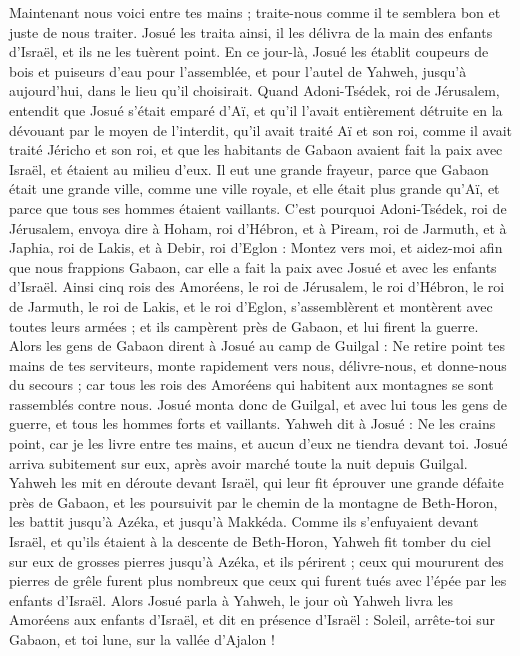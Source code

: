 \begin{multicols}{2}
Maintenant nous voici entre tes mains ; traite-nous comme il te semblera bon et juste de nous traiter.
Josué les traita ainsi, il les délivra de la main des enfants d’Israël, et ils ne les tuèrent point.
En ce jour-là, Josué les établit coupeurs de bois et puiseurs d’eau pour l’assemblée, et pour l’autel de Yahweh, jusqu’à aujourd’hui, dans le lieu qu’il choisirait.
\VerseOne{}Quand Adoni-Tsédek, roi de Jérusalem, entendit que Josué s’était emparé d’Aï, et qu’il l’avait entièrement détruite en la dévouant par le moyen de l'interdit, qu’il avait traité Aï et son roi, comme il avait traité Jéricho et son roi, et que les habitants de Gabaon avaient fait la paix avec Israël, et étaient au milieu d’eux.
Il eut une grande frayeur, parce que Gabaon était une grande ville, comme une ville royale, et elle était plus grande qu’Aï, et parce que tous ses hommes étaient vaillants.
C’est pourquoi Adoni-Tsédek, roi de Jérusalem, envoya dire à Hoham, roi d’Hébron, et à Piream, roi de Jarmuth, et à Japhia, roi de Lakis, et à Debir, roi d’Eglon :
Montez vers moi, et aidez-moi afin que nous frappions Gabaon, car elle a fait la paix avec Josué et avec les enfants d’Israël.
Ainsi cinq rois des Amoréens, le roi de Jérusalem, le roi d’Hébron, le roi de Jarmuth, le roi de Lakis, et le roi d’Eglon, s’assemblèrent et montèrent avec toutes leurs armées ; et ils campèrent près de Gabaon, et lui firent la guerre.
Alors les gens de Gabaon dirent à Josué au camp de Guilgal : Ne retire point tes mains de tes serviteurs, monte rapidement vers nous, délivre-nous, et donne-nous du secours ; car tous les rois des Amoréens qui habitent aux montagnes se sont rassemblés contre nous.
Josué monta donc de Guilgal, et avec lui tous les gens de guerre, et tous les hommes forts et vaillants.
Yahweh dit à Josué : Ne les crains point, car je les livre entre tes mains, et aucun d’eux ne tiendra devant toi.
Josué arriva subitement sur eux, après avoir marché toute la nuit depuis Guilgal.
Yahweh les mit en déroute devant Israël, qui leur fit éprouver une grande défaite près de Gabaon, et les poursuivit par le chemin de la montagne de Beth-Horon, les battit jusqu’à Azéka, et jusqu’à Makkéda.
Comme ils s’enfuyaient devant Israël, et qu’ils étaient à la descente de Beth-Horon, Yahweh fit tomber du ciel sur eux de grosses pierres jusqu’à Azéka, et ils périrent ; ceux qui moururent des pierres de grêle furent plus nombreux que ceux qui furent tués avec l’épée par les enfants d’Israël.
Alors Josué parla à Yahweh, le jour où Yahweh livra les Amoréens aux enfants d’Israël, et dit en présence d’Israël : Soleil, arrête-toi sur Gabaon, et toi lune, sur la vallée d’Ajalon !

\end{multicols}

